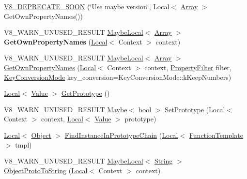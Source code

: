 \begin{DoxyCompactItemize}
\item 
\mbox{\hyperlink{classv8_1_1Object_aa72e9d0d22d1d4a4c4b63827a5469d40}{V8\+\_\+\+D\+E\+P\+R\+E\+C\+A\+T\+E\+\_\+\+S\+O\+ON}} (\char`\"{}Use maybe version\char`\"{}, Local$<$ \mbox{\hyperlink{classv8_1_1Array}{Array}} $>$ Get\+Own\+Property\+Names())
\item 
\mbox{\label{classv8_1_1Object_a57cb76115bb2e0be18f4b06c6e7f9580}} 
V8\+\_\+\+W\+A\+R\+N\+\_\+\+U\+N\+U\+S\+E\+D\+\_\+\+R\+E\+S\+U\+LT \mbox{\hyperlink{classv8_1_1MaybeLocal}{Maybe\+Local}}$<$ \mbox{\hyperlink{classv8_1_1Array}{Array}} $>$ {\bfseries Get\+Own\+Property\+Names} (\mbox{\hyperlink{classv8_1_1Local}{Local}}$<$ Context $>$ context)
\item 
V8\+\_\+\+W\+A\+R\+N\+\_\+\+U\+N\+U\+S\+E\+D\+\_\+\+R\+E\+S\+U\+LT \mbox{\hyperlink{classv8_1_1MaybeLocal}{Maybe\+Local}}$<$ \mbox{\hyperlink{classv8_1_1Array}{Array}} $>$ \mbox{\hyperlink{classv8_1_1Object_acafd12073cd193b98034772cef5498c8}{Get\+Own\+Property\+Names}} (\mbox{\hyperlink{classv8_1_1Local}{Local}}$<$ Context $>$ context, \mbox{\hyperlink{namespacev8_afbf02b6b1152a3e25d7bde90798209ac}{Property\+Filter}} filter, \mbox{\hyperlink{namespacev8_aa65aeff871614520d8033dead4b34e38}{Key\+Conversion\+Mode}} key\+\_\+conversion=Key\+Conversion\+Mode\+::k\+Keep\+Numbers)
\item 
\mbox{\hyperlink{classv8_1_1Local}{Local}}$<$ \mbox{\hyperlink{classv8_1_1Value}{Value}} $>$ \mbox{\hyperlink{classv8_1_1Object_a684cd61c13957c5b90c0ea0a50749dd1}{Get\+Prototype}} ()
\item 
V8\+\_\+\+W\+A\+R\+N\+\_\+\+U\+N\+U\+S\+E\+D\+\_\+\+R\+E\+S\+U\+LT \mbox{\hyperlink{classv8_1_1Maybe}{Maybe}}$<$ \mbox{\hyperlink{classbool}{bool}} $>$ \mbox{\hyperlink{classv8_1_1Object_a2c46cb0021b8cf761e83bf562badf572}{Set\+Prototype}} (\mbox{\hyperlink{classv8_1_1Local}{Local}}$<$ Context $>$ context, \mbox{\hyperlink{classv8_1_1Local}{Local}}$<$ \mbox{\hyperlink{classv8_1_1Value}{Value}} $>$ prototype)
\item 
\mbox{\hyperlink{classv8_1_1Local}{Local}}$<$ \mbox{\hyperlink{classv8_1_1Object}{Object}} $>$ \mbox{\hyperlink{classv8_1_1Object_abd62f72947a0ddad5ada4fbfbb0194ef}{Find\+Instance\+In\+Prototype\+Chain}} (\mbox{\hyperlink{classv8_1_1Local}{Local}}$<$ \mbox{\hyperlink{classv8_1_1FunctionTemplate}{Function\+Template}} $>$ tmpl)
\item 
V8\+\_\+\+W\+A\+R\+N\+\_\+\+U\+N\+U\+S\+E\+D\+\_\+\+R\+E\+S\+U\+LT \mbox{\hyperlink{classv8_1_1MaybeLocal}{Maybe\+Local}}$<$ \mbox{\hyperlink{classv8_1_1String}{String}} $>$ \mbox{\hyperlink{classv8_1_1Object_a8e9c3e8be24b1d4ae1f943af261d45ae}{Object\+Proto\+To\+String}} (\mbox{\hyperlink{classv8_1_1Local}{Local}}$<$ Context $>$ context)

\end{DoxyCompactItemize}
